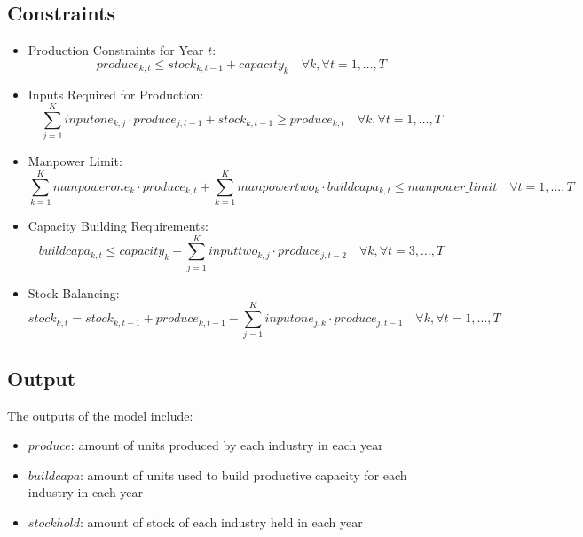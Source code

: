 \documentclass{article}
\begin{document}
\subsection*{Constraints}
\begin{itemize}
    \item Production Constraints for Year \( t \):
    \[
    produce_{k, t} \leq stock_{k, t-1} + capacity_{k} \quad \forall k, \forall t = 1, \ldots, T
    \]
    
    \item Inputs Required for Production:
    \[
    \sum_{j=1}^{K} inputone_{k,j} \cdot produce_{j,t-1} + stock_{k,t-1} \geq produce_{k,t} \quad \forall k, \forall t = 1, \ldots, T
    \]

    \item Manpower Limit:
    \[
    \sum_{k=1}^{K} manpowerone_{k} \cdot produce_{k,t} + \sum_{k=1}^{K} manpowertwo_{k} \cdot buildcapa_{k,t} \leq manpower\_limit \quad \forall t = 1, \ldots, T
    \]

    \item Capacity Building Requirements:
    \[
    buildcapa_{k,t} \leq capacity_{k} + \sum_{j=1}^{K} inputtwo_{k,j} \cdot produce_{j,t-2} \quad \forall k, \forall t = 3, \ldots, T
    \]

    \item Stock Balancing:
    \[
    stock_{k,t} = stock_{k,t-1} + produce_{k,t-1} - \sum_{j=1}^{K} inputone_{j,k} \cdot produce_{j,t-1} \quad \forall k, \forall t = 1, \ldots, T
    \]
\end{itemize}

\subsection*{Output}
The outputs of the model include:
\begin{itemize}
    \item \( produce \): amount of units produced by each industry in each year
    \item \( buildcapa \): amount of units used to build productive capacity for each industry in each year
    \item \( stockhold \): amount of stock of each industry held in each year
\end{itemize}
\end{document}
